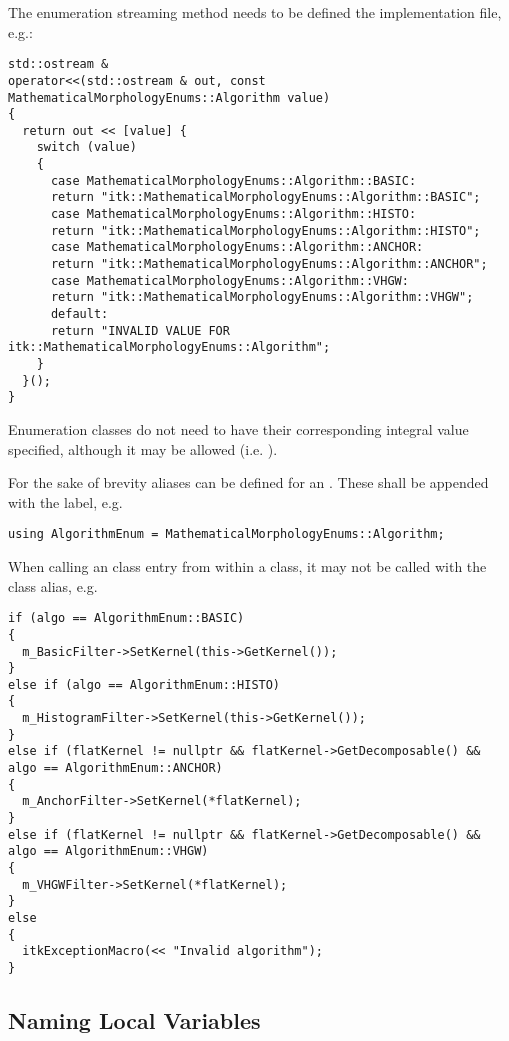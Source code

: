 The enumeration streaming method needs to be defined the implementation file, e.g.:
\small
\begin{verbatim}
std::ostream &
operator<<(std::ostream & out, const MathematicalMorphologyEnums::Algorithm value)
{
  return out << [value] {
    switch (value)
    {
      case MathematicalMorphologyEnums::Algorithm::BASIC:
      return "itk::MathematicalMorphologyEnums::Algorithm::BASIC";
      case MathematicalMorphologyEnums::Algorithm::HISTO:
      return "itk::MathematicalMorphologyEnums::Algorithm::HISTO";
      case MathematicalMorphologyEnums::Algorithm::ANCHOR:
      return "itk::MathematicalMorphologyEnums::Algorithm::ANCHOR";
      case MathematicalMorphologyEnums::Algorithm::VHGW:
      return "itk::MathematicalMorphologyEnums::Algorithm::VHGW";
      default:
      return "INVALID VALUE FOR itk::MathematicalMorphologyEnums::Algorithm";
    }
  }();
}
\end{verbatim}
\normalsize

Enumeration classes do not need to have their corresponding integral value
specified, although it may be allowed (i.e. ).

For the sake of brevity aliases can be defined for an . These
shall be appended with the  label, e.g.
\small
\begin{verbatim}
using AlgorithmEnum = MathematicalMorphologyEnums::Algorithm;
\end{verbatim}
\normalsize

When calling an  class entry from within a class, it may not be called with
the  class alias, e.g.
\small
\begin{verbatim}
if (algo == AlgorithmEnum::BASIC)
{
  m_BasicFilter->SetKernel(this->GetKernel());
}
else if (algo == AlgorithmEnum::HISTO)
{
  m_HistogramFilter->SetKernel(this->GetKernel());
}
else if (flatKernel != nullptr && flatKernel->GetDecomposable() && algo == AlgorithmEnum::ANCHOR)
{
  m_AnchorFilter->SetKernel(*flatKernel);
}
else if (flatKernel != nullptr && flatKernel->GetDecomposable() && algo == AlgorithmEnum::VHGW)
{
  m_VHGWFilter->SetKernel(*flatKernel);
}
else
{
  itkExceptionMacro(<< "Invalid algorithm");
}
\end{verbatim}
\normalsize


\subsection{Naming Local Variables}
\label{subsec:NamingLocalVariables}

